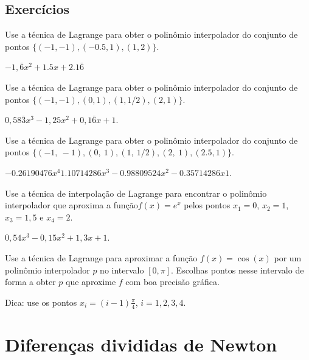 \subsection*{Exercícios}

\begin{exer}
  Use a técnica de Lagrange para obter o polinômio interpolador do conjunto de pontos $\{(-1, -1), (-0.5, 1), (1, 2)\}$.
\end{exer}
\begin{resp}
  $-1,\bar{6}x^2 + 1.5x + 2.1\bar{6}$
\end{resp}

\begin{exer}
  Use a técnica de Lagrange para obter o polinômio interpolador do conjunto de pontos $\{(-1, -1), (0, 1), (1, 1/2), (2, 1)\}$.
\end{exer}
\begin{resp}
  $0,58\bar{3}x^3 - 1,25x^2 + 0,1\bar{6}x + 1$. 
\end{resp}

\begin{exer}
  Use a técnica de Lagrange para obter o polinômio interpolador do conjunto de pontos $\{(-1,~-1), (0,~1), (1,~1/2), (2,~1), (2.5, 1)\}$.
\end{exer}
\begin{resp}
  $-0.26190476x^4  1.10714286x^3 -0.98809524x^2 -0.35714286x  1$.  
\end{resp}

\begin{exer}
  Use a técnica de interpolação de Lagrange para encontrar o polinômio interpolador que aproxima a função$f(x)=e^{x}$ pelos pontos $x_1=0$, $x_2=1$, $x_3=1,5$ e $x_4=2$.
\end{exer}
\begin{resp}
$0,54x^3 - 0,15x^2 + 1,3x + 1$.
\end{resp}

\begin{exer}
  Use a técnica de Lagrange para aproximar a função $f(x) = \cos(x)$ por um polinômio interpolador $p$ no intervalo $[0, \pi]$. Escolhas pontos nesse intervalo de forma a obter $p$ que aproxime $f$ com boa precisão gráfica.
\end{exer}
\begin{resp}
  Dica: use os pontos $x_i = (i-1)\frac{\pi}{4}$, $i=1,2,3,4$.
\end{resp}

\section{Diferenças divididas de Newton}\label{cap_interp_difdiv}

